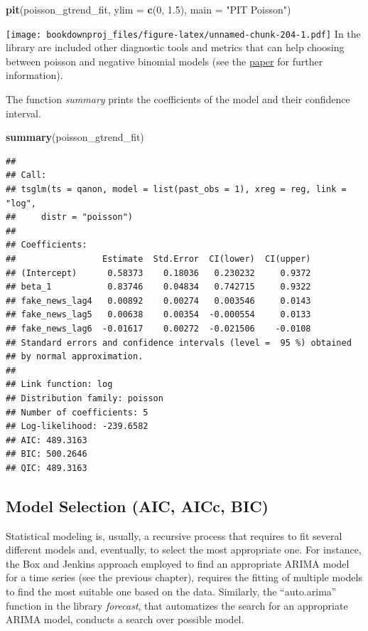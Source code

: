 \documentclass[
]{article}
\newenvironment{Shaded}{\begin{snugshade}}{\end{snugshade}}
\newcommand{\DataTypeTok}[1]{\textcolor[rgb]{0.13,0.29,0.53}{#1}}
\newcommand{\DecValTok}[1]{\textcolor[rgb]{0.00,0.00,0.81}{#1}}
\newcommand{\FloatTok}[1]{\textcolor[rgb]{0.00,0.00,0.81}{#1}}
\newcommand{\KeywordTok}[1]{\textcolor[rgb]{0.13,0.29,0.53}{\textbf{#1}}}
\newcommand{\NormalTok}[1]{#1}
\newcommand{\StringTok}[1]{\textcolor[rgb]{0.31,0.60,0.02}{#1}}
\begin{document}
\begin{Shaded}
\begin{Highlighting}[]
\KeywordTok{pit}\NormalTok{(poisson_gtrend_fit, }\DataTypeTok{ylim =} \KeywordTok{c}\NormalTok{(}\DecValTok{0}\NormalTok{, }\FloatTok{1.5}\NormalTok{), }\DataTypeTok{main =} \StringTok{"PIT Poisson"}\NormalTok{) }
\end{Highlighting}
\end{Shaded}

\texttt{[image: bookdownproj\_files/figure-latex/unnamed-chunk-204-1.pdf]}
In the library are included other diagnostic tools and metrics that can help choosing between poisson and negative binomial models (see the \href{https://cran.r-project.org/web/packages/tscount/vignettes/tsglm.pdf}{paper} for further information).

The function \emph{summary} prints the coefficients of the model and their confidence interval.

\begin{Shaded}
\begin{Highlighting}[]
\KeywordTok{summary}\NormalTok{(poisson_gtrend_fit)}
\end{Highlighting}
\end{Shaded}

\begin{verbatim}
## 
## Call:
## tsglm(ts = qanon, model = list(past_obs = 1), xreg = reg, link = "log", 
##     distr = "poisson")
## 
## Coefficients:
##                 Estimate  Std.Error  CI(lower)  CI(upper)
## (Intercept)      0.58373    0.18036   0.230232     0.9372
## beta_1           0.83746    0.04834   0.742715     0.9322
## fake_news_lag4   0.00892    0.00274   0.003546     0.0143
## fake_news_lag5   0.00638    0.00354  -0.000554     0.0133
## fake_news_lag6  -0.01617    0.00272  -0.021506    -0.0108
## Standard errors and confidence intervals (level =  95 %) obtained
## by normal approximation.
## 
## Link function: log 
## Distribution family: poisson 
## Number of coefficients: 5 
## Log-likelihood: -239.6582 
## AIC: 489.3163 
## BIC: 500.2646 
## QIC: 489.3163
\end{verbatim}

\hypertarget{model-selection-aic-aicc-bic}{%
\subsection{Model Selection (AIC, AICc, BIC)}\label{model-selection-aic-aicc-bic}}

Statistical modeling is, usually, a recursive process that requires to fit several different models and, eventually, to select the most appropriate one. For instance, the Box and Jenkins approach employed to find an appropriate ARIMA model for a time series (see the previous chapter), requires the fitting of multiple models to find the most suitable one based on the data. Similarly, the ``auto.arima'' function in the library \emph{forecast}, that automatizes the search for an appropriate ARIMA model, conducts a search over possible model.
\end{document}
